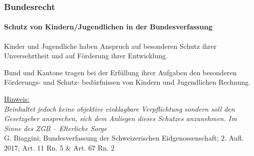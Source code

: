 \documentclass[11pt]{beamer}
\begin{document}
\begin{frame}
	\frametitle{Bundesrecht}
	\framesubtitle{Schutz von Kindern/Jugendlichen in der Bundesverfassung}
	\begin{description}[noitemsep]\setlength\itemsep{0.3em}
		\item[Art. 11 Ziff. 1] Kinder und Jugendliche haben Anspruch auf besonderen Schutz ihrer Unversehrtheit und auf Förderung ihrer Entwicklung.
		\item[Art. 67 Ziff. 1]  Bund und Kantone tragen bei der Erfüllung ihrer Aufgaben den besonderen Förderungs- und Schutz- bedürfnissen von Kindern und Jugendlichen Rechnung.
	\end{description} 
	\vspace{2em}
	\underline{Hinweis:}\\
	\textit{Beinhaltet jedoch keine objektive einklagbare Verpflichtung sondern soll den Gesetzgeber ansprechen, sich dem Anliegen dieses Schutzes anzunehmen. Im Sinne des ZGB -- Elterliche Sorge}	\\
	{\footnotesize  G. Biaggini; Bundesverfassung der Schweizerischen Eidgenossenschaft; 2. Aufl. 2017; Art. 11 Rn. 5 \& Art. 67 Rn. 2}
	
\end{frame}
\end{document}

